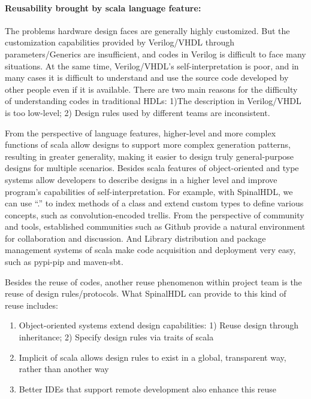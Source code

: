 \documentclass{article}
\begin{document}
\paragraph{\textbf{Reusability brought by scala language feature:}}

The problems hardware design faces are generally highly customized. But the customization capabilities provided by Verilog/VHDL through parameters/Generics are insufficient, and codes in Verilog is difficult to face many situations. At the same time, Verilog/VHDL's self-interpretation is poor, and in many cases it is difficult to understand and use the source code developed by other people even if it is available. There are two main reasons for the difficulty of understanding codes in traditional HDLs: 1)The description in Verilog/VHDL is too low-level; 2) Design rules used by different teams are inconsistent. 

From the perspective of language features, higher-level and more complex functions of scala allow designs to support more complex generation patterns, resulting in greater generality, making it easier to design truly general-purpose designs for multiple scenarios. Besides scala features of object-oriented and type systems allow developers to describe designs in a higher level and improve program’s capabilities of self-interpretation. For example, with SpinalHDL, we can use “.” to index methods of a class and extend custom types to define various concepts, such as convolution-encoded trellis. From the perspective of community and tools, established communities such as Github provide a natural environment for collaboration and discussion. And Library distribution and package management systems of scala make code acquisition and deployment very easy, such as pypi-pip and maven-sbt.

Besides the reuse of codes, another reuse phenomenon within project team is the reuse of design rules/protocols. What SpinalHDL can provide to this kind of reuse includes:
\begin{enumerate}
    \item Object-oriented systems extend design capabilities:  1) Reuse design through inheritance; 2) Specify design rules via traits of scala
    \item Implicit of scala allows design rules to exist in a global, transparent way, rather than another way
    \item Better IDEs that support remote development also enhance this reuse
\end{enumerate}
\end{document}
